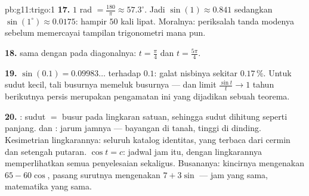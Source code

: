 \begin{solution}{pb:g11:trigo:1}
\textbf{17.} $1$ rad $= \frac{180}{\pi} \approx 57.3^\circ$.
Jadi $\sin(1) \approx 0.841$ sedangkan $\sin(1^\circ) \approx
0.0175$: hampir $50$ kali lipat. Moralnya: periksalah tanda modenya
sebelum memercayai tampilan trigonometri mana pun.

\textbf{18.}  sama dengan  pada diagonalnya:
$t = \frac\pi4$ dan $t = \frac{5\pi}{4}$.

\textbf{19.} $\sin(0.1) = 0.09983\ldots$ terhadap $0.1$:
galat nisbinya sekitar $0.17\,\%$. Untuk sudut kecil, tali busurnya
memeluk busurnya --- dan limit $\frac{\sin t}{t} \to 1$ tahun
berikutnya persis merupakan pengamatan ini yang dijadikan
sebuah teorema.

\textbf{20.} : sudut $=$ busur pada lingkaran satuan, sehingga
sudut dihitung seperti panjang.  dan : 
jarum jamnya --- bayangan di tanah, tinggi di
dinding. Kesimetrian lingkarannya: seluruh katalog
identitas, yang terbaca dari cermin dan setengah putaran. 
$\cos t = c$: jadwal jam itu, dengan lingkarannya memperlihatkan
semua penyelesaian sekaligus. Busananya: kincirnya mengenakan
$65 - 60\cos$, pasang surutnya mengenakan $7 + 3\sin$ --- jam yang sama,
matematika yang sama.

\end{solution}
